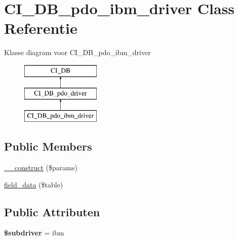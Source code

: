\hypertarget{class_c_i___d_b__pdo__ibm__driver}{}\section{C\+I\+\_\+\+D\+B\+\_\+pdo\+\_\+ibm\+\_\+driver Class Referentie}
\label{class_c_i___d_b__pdo__ibm__driver}
Klasse diagram voor C\+I\+\_\+\+D\+B\+\_\+pdo\+\_\+ibm\+\_\+driver\begin{figure}[H]
\begin{center}
\leavevmode
\includegraphics[height=3.000000cm]{class_c_i___d_b__pdo__ibm__driver}
\end{center}
\end{figure}
\subsection*{Public Members}
\begin{DoxyCompactItemize}
\item 
\mbox{\hyperlink{class_c_i___d_b__pdo__ibm__driver_a9162320adff1a1a4afd7f2372f753a3e}{\+\_\+\+\_\+construct}} (\$params)
\item 
\mbox{\hyperlink{class_c_i___d_b__pdo__ibm__driver_a90355121e1ed009e0efdbd544ab56efa}{field\+\_\+data}} (\$table)
\end{DoxyCompactItemize}
\subsection*{Public Attributen}
\begin{DoxyCompactItemize}
\item 
\mbox{\label{class_c_i___d_b__pdo__ibm__driver_a1322ca756348b11d080cb7a4f590de15}} 
{\bfseries \$subdriver} = \textquotesingle{}ibm\textquotesingle{}
\end{DoxyCompactItemize}
